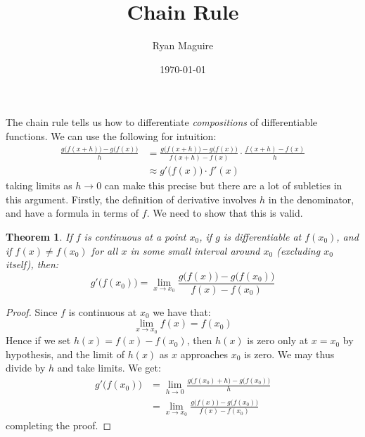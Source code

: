\documentclass{article}
\title{Chain Rule}
\author{Ryan Maguire}
\date{\today}
\theoremstyle{plain}
\newtheorem{theorem}{Theorem}
\begin{document}
    \maketitle
    The chain rule tells us how to differentiate \textit{compositions} of
    differentiable functions. We can use the following for intuition:
    \begin{align}
        \frac{g\big(f(x+h)\big)-g\big(f(x)\big)}{h}
            &=\frac{g\big(f(x+h)\big)-g\big(f(x)\big)}{f(x+h)-f(x)}
            \cdot\frac{f(x+h)-f(x)}{h}\\
            &\approx
                g'\big(f(x)\big)\cdot{f}'(x)
    \end{align}
    taking limits as $h\rightarrow{0}$ can make this precise but there are a
    lot of subleties in this argument. Firstly, the definition of derivative
    involves $h$ in the denominator, and have a formula in terms of $f$. We
    need to show that this is valid.
    \begin{theorem}
        If $f$ is continuous at a point $x_{0}$, if $g$ is differentiable at
        $f(x_{0})$, and if $f(x)\ne{f}(x_{0})$ for all $x$ in some small
        interval around $x_{0}$ (excluding $x_{0}$ itself),
        then:
        \begin{equation}
            g'\big(f(x_{0})\big)=
                \lim_{x\rightarrow{x}_{0}}
                \frac{g\big(f(x)\big)-g\big(f(x_{0})\big)}{f(x)-f(x_{0})}
        \end{equation}
    \end{theorem}
    \begin{proof}
        Since $f$ is continuous at $x_{0}$ we have that:
        \begin{equation}
            \lim_{x\rightarrow{x}_{0}}f(x)=f(x_{0})
        \end{equation}
        Hence if we set $h(x)=f(x)-f(x_{0})$, then $h(x)$ is zero
        only at $x=x_{0}$ by hypothesis, and the limit of $h(x)$ as $x$
        approaches $x_{0}$ is zero. We may thus divide by $h$ and take
        limits. We get:
        \begin{align}
            g'\big(f(x_{0})\big)
            &=\lim_{h\rightarrow{0}}
                \frac{g\big(f(x_{0})+h\big)-g\big(f(x_{0})\big)}{h}\\
            &=\lim_{x\rightarrow{x}_{0}}
                \frac{g\big(f(x)\big)-g\big(f(x_{0})\big)}{f(x)-f(x_{0})}
        \end{align}
        completing the proof.
    \end{proof}
\end{document}
